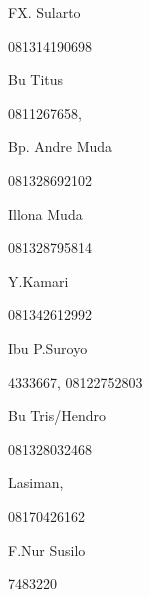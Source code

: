 \documentclass{article}
\begin{document}
\begin{figure}
\centering
\begin{minipage}{3.17cm}
FX. Sularto

081314190698
\end{minipage}
\end{figure}
\begin{figure}
\centering
\begin{minipage}{2.868cm}
Bu Titus

0811267658,

\end{minipage}
\end{figure}
\begin{figure}
\centering
\begin{minipage}{3.17cm}
Bp. Andre Muda

081328692102

Illona Muda

081328795814
\end{minipage}
\end{figure}
\begin{figure}
\centering
\begin{minipage}{3.572cm}
Y.Kamari

081342612992

\end{minipage}
\end{figure}
\begin{figure}
\centering
\begin{minipage}{3.17cm}
Ibu P.Suroyo

4333667, 08122752803

\end{minipage}
\end{figure}
\begin{figure}
\centering
\begin{minipage}{3.17cm}
Bu Tris/Hendro

081328032468
\end{minipage}
\end{figure}
\begin{figure}
\centering
\begin{minipage}{3.572cm}
Lasiman,

08170426162

\end{minipage}
\end{figure}
\begin{figure}
\centering
\begin{minipage}{3.572cm}
F.Nur Susilo

7483220
\end{minipage}
\end{figure}
\end{document}
